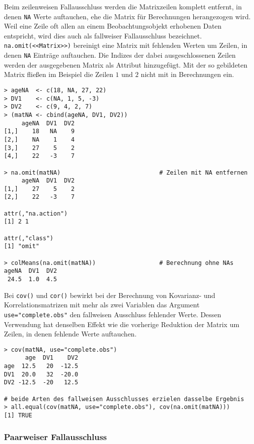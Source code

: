 Beim zeilenweisen Fallausschluss werden die Matrixzeilen komplett entfernt, in denen \lstinline!NA! Werte auftauchen, ehe die Matrix für Berechnungen herangezogen wird. Weil eine Zeile oft allen an einem Beobachtungsobjekt erhobenen Daten entspricht, wird dies auch als fallweiser Fallausschluss bezeichnet.  \lstinline!na.omit(<<Matrix>>)! bereinigt eine Matrix mit fehlenden Werten um Zeilen, in denen \lstinline!NA! Einträge auftauchen. Die Indizes der dabei ausgeschlossenen Zeilen werden der ausgegebenen Matrix als Attribut hinzugefügt. Mit der so gebildeten Matrix fließen im Beispiel die Zeilen $1$ und $2$ nicht mit in Berechnungen ein.
\begin{lstlisting}
> ageNA  <- c(18, NA, 27, 22)
> DV1    <- c(NA, 1, 5, -3)
> DV2    <- c(9, 4, 2, 7)
> (matNA <- cbind(ageNA, DV1, DV2))
     ageNA  DV1  DV2
[1,]    18   NA    9
[2,]    NA    1    4
[3,]    27    5    2
[4,]    22   -3    7

> na.omit(matNA)                            # Zeilen mit NA entfernen
     ageNA  DV1  DV2
[1,]    27    5    2
[2,]    22   -3    7

attr(,"na.action")
[1] 2 1

attr(,"class")
[1] "omit"

> colMeans(na.omit(matNA))                  # Berechnung ohne NAs
ageNA  DV1  DV2
 24.5  1.0  4.5
\end{lstlisting}

Bei \lstinline!cov()! und \lstinline!cor()! bewirkt bei der Berechnung von Kovarianz- und Korrelationsmatrizen mit mehr als zwei Variablen das Argument \lstinline!use="complete.obs"! den fallweisen Ausschluss fehlender Werte. Dessen Verwendung hat denselben Effekt wie die vorherige Reduktion der Matrix um Zeilen, in denen fehlende Werte auftauchen.
\begin{lstlisting}
> cov(matNA, use="complete.obs")
      age  DV1    DV2
age  12.5   20  -12.5
DV1  20.0   32  -20.0
DV2 -12.5  -20   12.5

# beide Arten des fallweisen Ausschlusses erzielen dasselbe Ergebnis
> all.equal(cov(matNA, use="complete.obs"), cov(na.omit(matNA)))
[1] TRUE
\end{lstlisting}

\subsubsection{Paarweiser Fallausschluss}

